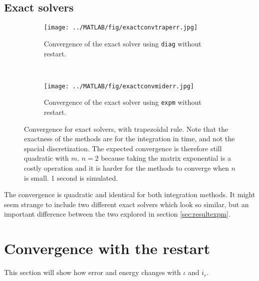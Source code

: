 \subsection{Exact solvers} %
\label{sec:exactconv}
\begin{figure}[H]
        \centering
        \begin{subfigure}[b]{0.30\textwidth}
                \texttt{[image: ../MATLAB/fig/exactconvtraperr.jpg]}
                \caption{ Convergence of the exact solver using \texttt{diag} without restart. }
                \label{fig:exactconvtraperr}
        \end{subfigure}
        ~
        \begin{subfigure}[b]{0.30\textwidth}
                \texttt{[image: ../MATLAB/fig/exactconvmiderr.jpg]}
                \caption{ Convergence of the exact solver using \texttt{expm} without restart. }  
				\label{fig:exactconvmiderr}
        \end{subfigure}         
       
\caption{Convergence for exact solvers, with trapezoidal rule. Note that the exactness of the methods are for the integration in time, and not the spacial discretization. The expected convergence is therefore still quadratic with $m$. $n = 2$ because taking the matrix exponential is a costly operation and it is harder for the methods to converge when $n$ is small. 1 second is simulated. } %
\label{fig:intexactt}
\end{figure}
The convergence is quadratic and identical for both integration methods. It might seem strange to include two different exact solvers which look so similar, but an important difference between the two explored in section \ref{sec:resultexpm}.

\section{Convergence with the restart}%
This section will show how error and energy changes with $\iota$ and $i_r$.
